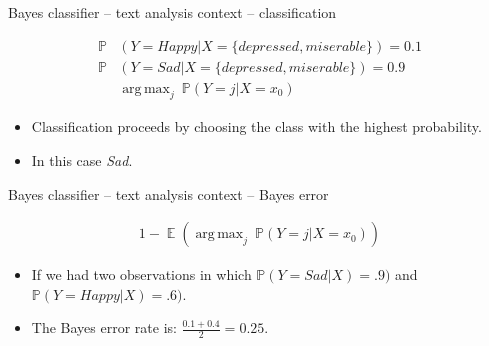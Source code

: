 \documentclass{beamer}
\DeclareMathOperator*{\E}{\mathbb{E}}
\DeclareMathOperator*{\argmax}{arg\,max}
\begin{document}
\begin{frame}{Bayes classifier -- text analysis context -- classification}

\begin{align*}
 \mathbb{P} & (Y = Happy | X = \{depressed, miserable\})  = 0.1 \\
 \mathbb{P} & (Y = Sad | X = \{depressed, miserable\})  = 0.9 \\
  & \argmax_{j} ~\mathbb{P}(Y = j | X = x_{0})
\end{align*}
	\begin{itemize}
		\item Classification proceeds by choosing the class with the highest probability.
		\item In this case \textit{Sad}.
		
	\end{itemize}
\end{frame}

\begin{frame}{Bayes classifier -- text analysis context -- Bayes error}

\begin{align*}
 1-  \E \left( \argmax_{j} ~\mathbb{P}(Y = j | X = x_{0}) \right)
\end{align*}
	\begin{itemize}
		\item If we had two observations in which $ \mathbb{P} (Y = Sad | X) = .9)$ and $ \mathbb{P} (Y = Happy | X) = .6)$.
		\item The Bayes error rate is: $ \frac{0.1 + 0.4}{2} = 0.25$.
		
	\end{itemize}
\end{frame}
\end{document}
